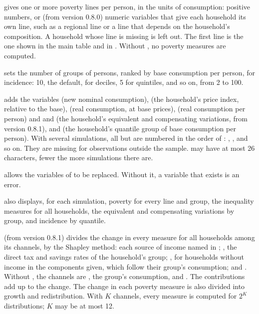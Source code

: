 \begin{optdesc}
\item[\optarg{}{line}{lines}] gives one or more poverty lines per person, in
the units of consumption: positive numbers, or (from version 0.8.0) numeric
variables that give each household its own line, such as a regional line or a
line that depends on the household's composition. A household whose line is
missing is left out. The first line is the one shown in the main table and in
. Without , no poverty measures are computed.

\item[\optarg{quant}{iles}{\#}] sets the number of groups of persons, ranked by
base consumption per person, for incidence: 10, the default, for deciles, 5
for quintiles, and so on, from 2 to 100.

\item[\optarg{gen}{erate}{prefix}] adds the variables 
(new nominal consumption),  (the household's price
index, relative to the base),  (real consumption, at base
prices),  (real consumption per person) and
 and  (the household's equivalent
and compensating variations, from version 0.8.1), and 
(the household's quantile group of base consumption per person). With several
simulations, all but  are numbered in the order of
: , , and so on.
They are missing for observations outside the sample.  may have
at most 26 characters, fewer the more simulations there are.

\item[\opt{}{replace}] allows the variables of  to be
replaced. Without it, a variable that exists is an error.

\item[\opt{det}{ail}] also displays, for each simulation, poverty for every
line and group, the inequality measures for all households, the equivalent and
compensating variations by group, and incidence by quantile.

\item[\opt{dec}{ompose}] (from version 0.8.1) divides the change in every
measure for all households among its channels, by the Shapley method: each
source of income named in ; , the direct tax and
savings rates of the household's group; , for households without
income in the components given, which follow their group's consumption; and
. Without , the channels are , the
group's consumption, and . The contributions add up to the change.
The change in each poverty measure is also divided into growth and
redistribution. With $K$ channels, every measure is computed for $2^K$
distributions; $K$ may be at most 12.


\end{optdesc}
